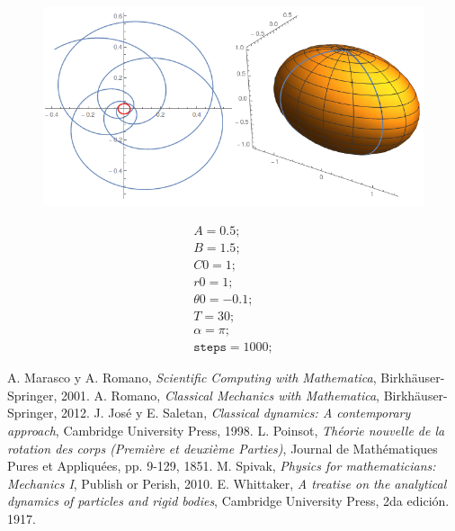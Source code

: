 \documentclass[a4paper,10pt]{article}
\numberwithin{equation}{section}
\begin{document}
\begin{multicols}{2}

\begin{figure}[H]
\center
\includegraphics[scale=0.35]{problema5fig5}
\label{fig:problema5fig5}
\end{figure}

\begin{equation*}
\begin{aligned}
 A = 0.5; \\
 B = 1.5; \\
 C0 = 1; \\ 
 r0 = 1; \\
 \theta 0 = -0.1; \\
 T = 30; \\
 \alpha = \pi; \\ 
 \texttt{steps} = 1000;
\end{aligned}
\end{equation*}

\end{multicols}
\begin{thebibliography}{10}
 A. Marasco y A. Romano, \emph{Scientific Computing with Mathematica\textregistered}, Birkhäuser-Springer,
 2001.
 A. Romano, \emph{Classical Mechanics with Mathematica\textregistered}, Birkhäuser-Springer, 
 2012.
 J. José y E. Saletan, \emph{Classical dynamics: A contemporary approach}, Cambridge University Press,
 1998.
 L. Poinsot, \emph{Théorie nouvelle de la rotation des corps (Première et deuxième Parties)}, 
 Journal de Mathématiques Pures et Appliquées, pp. 9-129, 1851.
 M. Spivak, \emph{Physics for mathematicians: Mechanics I}, Publish or Perish,
 2010.
 E. Whittaker, \emph{A treatise on the analytical dynamics of particles 
 and rigid bodies}, Cambridge University Press, 2da edición. 1917.
\end{thebibliography}
\end{document}
